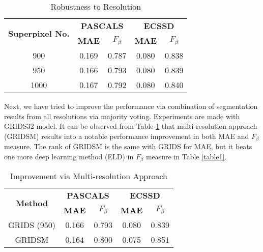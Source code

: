 \documentclass[a4paper,conference]{IEEEtran}
\begin{document}
\begin{table}[!t]
\renewcommand{\arraystretch}{1.3}
\caption{Robustness to Resolution}
\label{table3}
\centering
\begin{tabular}{|c||c||c||c||c|}
\hline
    \multirow{2}{2cm}{\textbf{Superpixel No.}} & \multicolumn{2}{c|}{\textbf{PASCALS}} & \multicolumn{2}{c|}{\textbf{ECSSD}}   \\
    \cline{2-5}
     &\textbf{MAE} & \textbf{$F_\beta$} & \textbf{MAE} & \textbf{$F_\beta$}   \\
    \hline

    900 & 0.169 & 0.787 & 0.080 & 0.838   \\ \hline    
    950 & 0.166 & 0.793 & 0.080 & 0.839 \\ \hline
    1000 & 0.167 & 0.792 & 0.080 & 0.840  \\ \hline

\end{tabular}
\end{table}

Next, we have tried to improve the performance via combination of segmentation results from all resolutions via majority voting. 
Experiments are made with GRIDS32 model.
It can be observed from Table \ref{table3} that multi-resolution approach (GRIDSM) results into a notable performance improvement in both MAE and $F_\beta$ measure.
The rank of GRIDSM is the same with GRIDS for MAE, but it beats one more deep learning method (ELD) in $F_\beta$ measure in Table \ref{table1}.


\begin{table}[!t]
\renewcommand{\arraystretch}{1.3}
\caption{Improvement via Multi-resolution Approach}
\label{table4}
\centering
\begin{tabular}{|c||c||c||c||c|}
\hline
    \multirow{2}{2cm}{\textbf{Method}} & \multicolumn{2}{c|}{\textbf{PASCALS}} & \multicolumn{2}{c|}{\textbf{ECSSD}}   \\
    \cline{2-5}
     &\textbf{MAE} & \textbf{$F_\beta$} & \textbf{MAE} & \textbf{$F_\beta$}   \\
    \hline

    GRIDS (950) & 0.166 & 0.793 & 0.080 & 0.839    \\ \hline    
    GRIDSM & 0.164 & 0.800 & 0.075 & 0.851 \\ \hline

\end{tabular}
\end{table}
\end{document}
